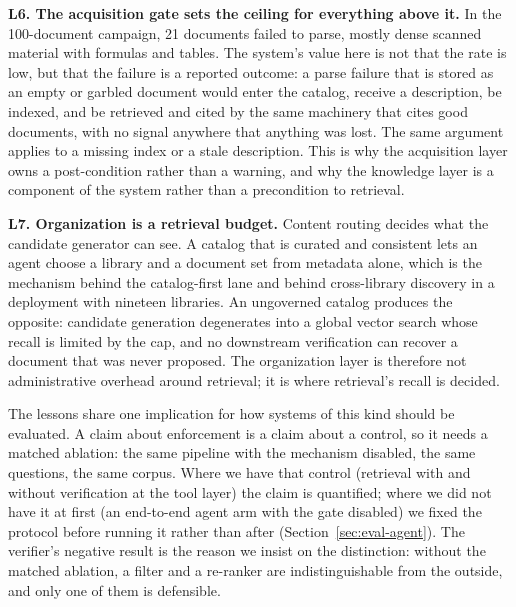 \noindent\textbf{L6. The acquisition gate sets the ceiling for everything
above it.} In the 100-document campaign, 21 documents failed to parse, mostly
dense scanned material with formulas and tables. The system's value here is
not that the rate is low, but that the failure is a reported outcome: a
parse failure that is stored as an empty or garbled document would enter the
catalog, receive a description, be indexed, and be retrieved and cited by the
same machinery that cites good documents, with no signal anywhere that
anything was lost. The same argument applies to a missing index or a stale
description. This is why the acquisition layer owns a post-condition rather
than a warning, and why the knowledge layer is a component of the system
rather than a precondition to retrieval.

\noindent\textbf{L7. Organization is a retrieval budget.} Content routing
decides what the candidate generator can see. A catalog that is curated and
consistent lets an agent choose a library and a document set from metadata
alone, which is the mechanism behind the catalog-first lane and behind
cross-library discovery in a deployment with nineteen libraries. An
ungoverned catalog produces the opposite: candidate generation degenerates
into a global vector search whose recall is limited by the cap, and no
downstream verification can recover a document that was never proposed. The
organization layer is therefore not administrative overhead around retrieval;
it is where retrieval's recall is decided.

The lessons share one implication for how systems of this kind should be
evaluated. A claim about enforcement is a claim about a control, so it needs a
matched ablation: the same pipeline with the mechanism disabled, the same
questions, the same corpus. Where we have that control (retrieval with and
without verification at the tool layer) the claim is quantified; where we did
not have it at first (an end-to-end agent arm with the gate disabled) we fixed
the protocol before running it rather than after
(Section~\ref{sec:eval-agent}). The verifier's negative result is the reason
we insist on the distinction: without the matched ablation, a filter and a
re-ranker are indistinguishable from the outside, and only one of them is
defensible.
